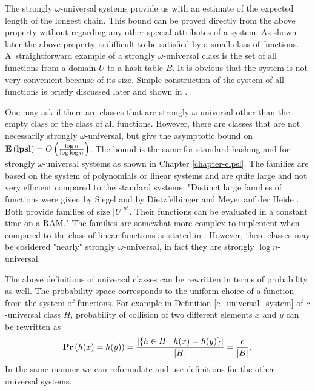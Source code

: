 The strongly $\omega$-universal systems provide us with an estimate of the expected length of the longest chain. This bound can be proved directly from the above property without regarding any other special attributes of a system. As shown later the above property is difficult to be satisfied by a small class of functions. A~straightforward example of a strongly $\omega$-universal class is the set of all functions from a domain $U$ to a hash table $B$. It is obvious that the system is not very convenient because of its size. Simple construction of the system of all functions is briefly discussed later and shown in \cite{1382617}.

One may ask if there are classes that are strongly $\omega$-universal other than the empty class or the class of all functions. However, there are classes that are not necessarily strongly $\omega$-universal, but give the asymptotic bound on $\mathbf{E}\left(\mathbf{lpsl}\right) = O\left(\frac{\log n}{\log \log n}\right)$. The bound is the same for standard hashing and for strongly $\omega$-universal systems as shown in Chapter \ref{chapter-elpsl}. The families are based on the system of polynomials or linear systems and are quite large and not very efficient compared to the standard systems. "Distinct large families of functions were given by Siegel \cite{90406} and by Dietzfelbinger and Meyer auf der Heide \cite{1398663}. Both provide families of size $|U|^{n^\epsilon}$. Their functions can be evaluated in a constant time on a RAM." The families are somewhat more complex to implement when compared to the class of linear functions as stated in \cite{1382617}. However, these classes may be cosidered "nearly" strongly $\omega$-universal, in fact they are strongly $\log n$-universal.

The above definitions of universal classes can be rewritten in terms of probability as well. The probability space corresponds to the uniform choice of a function from the system of functions. For example in Definition \ref{c_universal_system} of $c$-universal class $H$, probability of collision of two different elements $x$ and $y$ can be rewritten as
\[
	\mathbf{Pr}\left(h(x) = h(y)\right) = \frac{|\{h \in H \mid h(x) = h(y)\}|}{|H|} = \frac{c}{|B|} \text{.}
\]
In the same manner we can reformulate and use definitions for the other universal systems.

